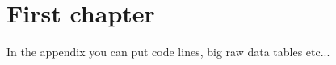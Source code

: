 \chapter{First chapter}\label{chap:appendixResearchVessel}

In the appendix you can put code lines, big raw data tables etc...
